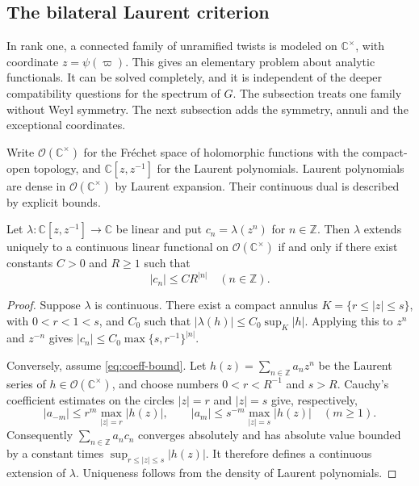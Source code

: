 \subsection{The bilateral Laurent criterion}\label{sec:analytic}
In rank one, a connected family of unramified twists is modeled on $\mathbb C^\times$, with coordinate $z=\psi(\varpi)$. This gives an elementary problem about analytic functionals. It can be solved completely, and it is independent of the deeper compatibility questions for the spectrum of $G$. The subsection treats one family without Weyl symmetry. The next subsection adds the symmetry, annuli and the exceptional coordinates.

Write $\mathcal O(\mathbb C^\times)$ for the Fr\'echet space of holomorphic functions with the compact-open topology, and $\mathbb C[z,z^{-1}]$ for the Laurent polynomials. Laurent polynomials are dense in $\mathcal O(\mathbb C^\times)$ by Laurent expansion. Their continuous dual is described by explicit bounds.

\begin{theorem}\label{thm:laurent}
Let $\lambda:\mathbb C[z,z^{-1}]\to\mathbb C$ be linear and put $c_n=\lambda(z^n)$ for $n\in\mathbb Z$. Then $\lambda$ extends uniquely to a continuous linear functional on $\mathcal O(\mathbb C^\times)$ if and only if there exist constants $C>0$ and $R\ge1$ such that
\begin{equation}\label{eq:coeff-bound}
|c_n|\le C R^{|n|}\quad(n\in\mathbb Z).
\end{equation}
\end{theorem}
\begin{proof}
Suppose $\lambda$ is continuous. There exist a compact annulus $K=\{r\le|z|\le s\}$, with $0<r<1<s$, and $C_0$ such that $|\lambda(h)|\le C_0\sup_K|h|$. Applying this to $z^n$ and $z^{-n}$ gives $|c_n|\le C_0\max\{s,r^{-1}\}^{|n|}$.

Conversely, assume \eqref{eq:coeff-bound}. Let $h(z)=\sum_{n\in\mathbb Z}a_nz^n$ be the Laurent series of $h\in\mathcal O(\mathbb C^\times)$, and choose numbers $0<r<R^{-1}$ and $s>R$.  Cauchy's coefficient estimates on the circles $|z|=r$ and $|z|=s$ give, respectively,
\[
|a_{-m}|\le r^m\max_{|z|=r}|h(z)|,\qquad
|a_m|\le s^{-m}\max_{|z|=s}|h(z)|\quad(m\ge1).
\]
Consequently $\sum_{n\in\mathbb Z}a_nc_n$ converges absolutely and has absolute value bounded by a constant times $\sup_{r\le|z|\le s}|h(z)|$.  It therefore defines a continuous extension of $\lambda$. Uniqueness follows from the density of Laurent polynomials.
\end{proof}

